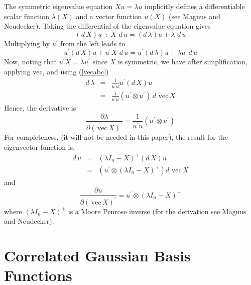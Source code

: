 \documentclass[12pt,thmsa,suthesis,verbatim]{report}
\begin{document}
The symmetric eigenvalue equation $Xu=\lambda u$ implicitly defines a
differentiable scalar function $\lambda \left( X\right) $ and a vector
function $u\left( X\right) $ (see Magnus and Neudecker\cite{MagNeud88}).
Taking the differential of the eigenvalue equation gives 
\begin{equation}
\left( d\,X\right) u+X\,\,d\,u=\left( d\,\lambda \right) u+\lambda \,\,d\,u
\end{equation}
Multiplying by $u^{\prime }$ from the left leads to 
\begin{equation}
u^{\prime }\left( d\,X\right) u+u^{\prime }X\,\,d\,u=u^{\prime }\left(
d\,\lambda \right) u+\lambda u^{\prime }\,d\,u
\end{equation}
Now, noting that $u^{\prime }X=\lambda u^{\prime }$ since $X$ is symmetric,
we have after simplification, applying vec, and using (\ref{vecabc}) 
\begin{eqnarray}
d\,\lambda &=&\frac 1{u^{\prime }u}u^{\prime }\left( d\,X\right) u  \nonumber
\\
\ &=&\frac 1{u^{\prime }u}\left( u^{\prime }\otimes u^{\prime }\right)
\,d\,\,\mathrm{vec}\,X
\end{eqnarray}
Hence, the derivative is 
\begin{equation}
\frac{\partial \lambda }{\partial \left( \,\mathrm{vec}\,X\right) ^{\prime }}%
=\frac 1{u^{\prime }u}\left( u^{\prime }\otimes u^{\prime }\right)
\end{equation}
For completeness, (it will not be needed in this paper), the result for the
eigenvector function is, 
\begin{eqnarray}
d\,u &=&\left( \lambda I_n-X\right) ^{+}\left( d\,X\right) u  \nonumber \\
\ &=&\left( u^{\prime }\otimes \left( \lambda I_n-X\right) ^{+}\right) d\,\,%
\mathrm{vec}\,X
\end{eqnarray}
and 
\begin{equation}
\frac{\partial u}{\partial \left( \,\mathrm{vec}\,X\right) ^{\prime }}%
=u^{\prime }\otimes \left( \lambda I_n-X\right) ^{+}
\end{equation}
where $\left( \lambda I_n-X\right) ^{+}$ is a Moore Penrose inverse (for the
derivation see Magnus and Neudecker\cite{MagNeud88}).

\section{Correlated Gaussian Basis Functions}
\end{document}

